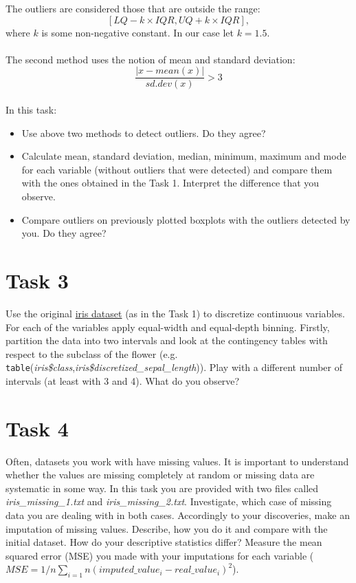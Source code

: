 \documentclass{article}
\begin{document}
The outliers are considered those that are outside the range:
$$[LQ - k\times IQR, UQ + k \times IQR],$$
where $k$ is some non-negative constant. In our case let $k = 1.5$.\\
\\
The second method uses the notion of mean and standard deviation:
$$\frac{|x-mean(x)|}{sd.dev(x)} > 3$$\\
In this task:
\begin{itemize}
\item Use above two methods to detect outliers. Do they agree?
\item Calculate  mean, standard deviation, median, minimum, maximum and mode for each variable (without outliers that were detected) and compare them with the ones obtained in the Task 1. Interpret the difference that you observe.
\item Compare outliers on previously plotted boxplots with the outliers detected by you. Do they agree?
\end{itemize}

\section*{Task 3}
Use the original \href{http://www0.cs.ucl.ac.uk/staff/m.herbster/GI07/week4/iris.data.txt}{iris dataset} (as in the Task 1) to discretize continuous variables. For each of the variables apply equal-width and equal-depth binning. Firstly, partition the data into two intervals and look at the contingency tables with respect to the subclass of the flower (e.g.  \texttt{table}(\emph{iris\$class},\emph{iris\$discretized\_sepal\_length})). Play with a different number of intervals (at least with 3 and 4). What do you observe?

\section*{Task 4}
Often, datasets you work with have missing values. It is important to understand whether the values are missing completely at random or missing data are systematic in some way. In this task you are provided with two files called \emph{iris\_missing\_1.txt} and \emph{iris\_missing\_2.txt}. Investigate, which case of missing data you are dealing with in both cases. Accordingly to your discoveries, make an imputation of missing values. Describe, how you do it and compare with the initial dataset. How do your descriptive statistics differ? Measure the mean squared error (MSE) you made with your imputations for each variable ($MSE = 1/n \sum_{i=1}{n}(imputed\_value_{i} - real\_value_{i})^2$).
\end{document}
